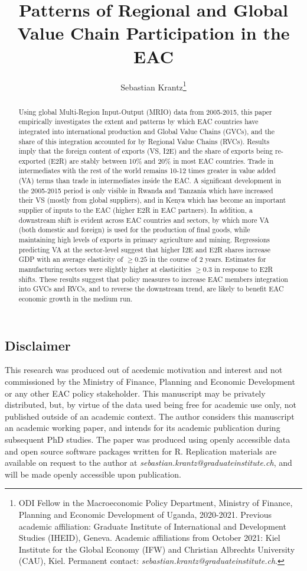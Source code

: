 \documentclass[a4paper]{article}
\title{\textbf{Patterns of Regional and Global Value Chain Participation in the EAC}}
\author{Sebastian Krantz\footnote{ODI Fellow in the Macroeconomic Policy Department, Ministry of Finance, Planning and Economic Development of Uganda, 2020-2021. Previous academic affiliation: Graduate Institute of International and Development Studies (IHEID), Geneva. Academic affiliations from October 2021: Kiel Institute for the Global Economy (IFW) and Christian Albrechts University (CAU), Kiel. Permanent contact: \emph{sebastian.krantz@graduateinstitute.ch}.}}
\begin{document}
\maketitle

\begin{abstract}
Using global Multi-Region Input-Output (MRIO) data from 2005-2015, this paper empirically investigates the extent and patterns by which EAC countries have integrated into international production and Global Value Chains (GVCs), and the share of this integration accounted for by Regional Value Chains (RVCs). Results imply that the foreign content of exports (VS, I2E) and the share of exports being re-exported (E2R) are stably between 10\% and 20\% in most EAC countries. Trade in intermediates with the rest of the world remains 10-12 times greater in value added (VA) terms than trade in intermediates inside the EAC. A significant development in the 2005-2015 period is only visible in Rwanda and Tanzania which have increased their VS (mostly from global suppliers), and in Kenya which has become an important supplier of inputs to the EAC (higher E2R in EAC partners). In addition, a downstream shift is evident across EAC countries and sectors, by which more VA (both domestic and foreign) is used for the production of final goods, while maintaining high levels of exports in primary agriculture and mining. Regressions predicting VA at the sector-level suggest that higher I2E and E2R shares increase GDP with an average elasticity of $\geq 0.25$ in the course of 2 years. Estimates for manufacturing sectors were slightly higher at elasticities $\geq 0.3$ in response to E2R shifts. These results suggest that policy measures to increase EAC members integration into GVCs and RVCs, and to reverse the downstream trend, are likely to benefit EAC economic growth in the medium run.  
\end{abstract}

\vspace{4.8cm}

\subsection*{Disclaimer}
This research was produced out of acedemic motivation and interest and not commissioned by the  Ministry of Finance, Planning and Economic Development or any other EAC policy stakeholder. This manuscript may be privately distributed, but, by virtue of the data used being free for academic use only, not published outside of an academic context. The author considers this manuscript an academic working paper, and intends for its academic publication during subsequent PhD studies. The paper was produced using openly accessible data and open source software packages written for R. Replication materials are available on request to the author at  \emph{sebastian.krantz@graduateinstitute.ch}, and will be made openly accessible upon publication. 
\end{document}

